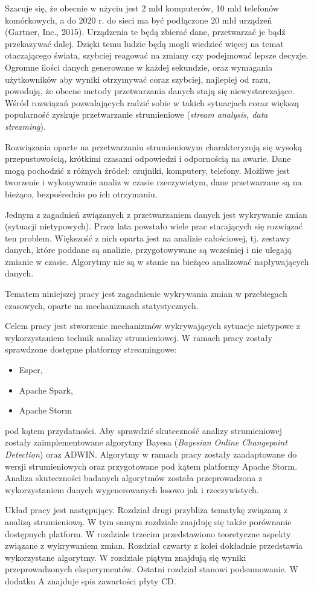 Szacuje się,
że obecnie w użyciu jest 2 mld komputerów,
10 mld telefonów komórkowych,
a do 2020 r. do sieci ma być podłączone 20 mld urządzeń (Gartner, Inc., 2015).
Urządzenia te będą zbierać dane,
przetwarzać je
bądź przekazywać dalej.
Dzięki temu ludzie będą mogli wiedzieć więcej na temat otaczającego świata,
szybciej reagować na zmiany
czy podejmować lepsze decyzje.
Ogromne ilości danych generowane w każdej sekundzie,
oraz wymagania użytkowników aby wyniki otrzymywać coraz szybciej,
najlepiej od razu,
powodują,
że obecne metody przetwarzania danych stają się niewystarczające.
Wśród rozwiązań pozwalających radzić sobie w takich sytuacjach
coraz większą popularność zyskuje przetwarzanie strumieniowe (\textit{stream analysis, data streaming}).

Rozwiązania oparte na przetwarzaniu strumieniowym charakteryzują się wysoką przepustowością,
krótkimi czasami odpowiedzi i odpornością na awarie.
Dane mogą pochodzić z różnych źródeł: czujniki, komputery, telefony.
Możliwe jest tworzenie i wykonywanie analiz w czasie rzeczywistym,
dane przetwarzane są na bieżąco,
bezpośrednio po ich otrzymaniu.

Jednym z zagadnień związanych z przetwarzaniem danych jest wykrywanie zmian (sytuacji nietypowych).
Przez lata powstało wiele prac starających się rozwiązać ten problem.
Większość z nich oparta jest na analizie całościowej,
tj. zestawy danych,
które poddane są analizie,
przygotowywane są wcześniej i nie ulegają zmianie w czasie.
Algorytmy nie są w stanie na bieżąco analizować napływających danych.

Tematem niniejszej pracy jest zagadnienie wykrywania zmian w przebiegach czasowych,
oparte na mechanizmach statystycznych.

Celem pracy jest stworzenie mechanizmów wykrywających sytuacje nietypowe
z wykorzystaniem technik analizy strumieniowej.
W ramach pracy zostały sprawdzone dostępne platformy streamingowe:
\begin{itemize}
  \item Esper,
  \item Apache Spark,
  \item Apache Storm
\end{itemize}
pod kątem przydatności.
Aby sprawdzić skuteczność analizy strumieniowej zostały zaimplementowane algorytmy Bayesa (\textit{Bayesian Online Changepoint Detection})
oraz ADWIN.
Algorytmy w ramach pracy zostały zaadaptowane do wersji strumieniowych oraz przygotowane pod kątem platformy Apache Storm.
Analiza skuteczności badanych algorytmów została przeprowadzona z wykorzystaniem danych wygenerowanych losowo jak i rzeczywistych.

Układ pracy jest następujący.
Rozdział drugi przybliża tematykę związaną z analizą strumieniową.
W tym samym rozdziale znajduję się także porównanie dostępnych platform.
W rozdziale trzecim przedstawiono teoretyczne aspekty związane z wykrywaniem zmian.
Rozdział czwarty z kolei dokładnie przedstawia wykorzystane algorytmy.
W rozdziale piątym znajdują się wyniki przeprowadzonych eksperymentów.
Ostatni rozdział stanowi podsumowanie.
W dodatku A znajduje spis zawartości płyty CD.
